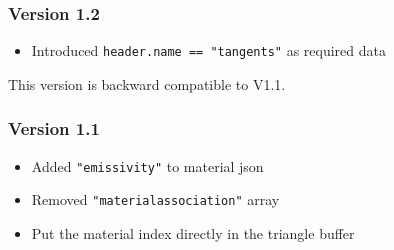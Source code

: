 \documentclass[english,10pt,a4paper,twocolumn,colorscheme=green]{orarticle}
\begin{document}
	\subsubsection{Version 1.2}
	\begin{itemize}
		\item Introduced \lstinline|header.name == "tangents"| as required data
	\end{itemize}
	This version is backward compatible to V1.1.
	\subsubsection{Version 1.1}
	\begin{itemize}
		\item Added \lstinline|"emissivity"| to material json
		\item Removed \lstinline|"materialassociation"| array
		\item Put the material index directly in the triangle buffer
	\end{itemize}
\end{document}
